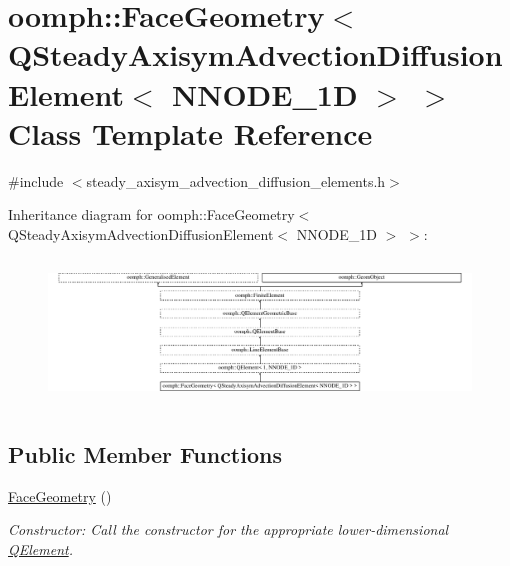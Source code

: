 \hypertarget{classoomph_1_1FaceGeometry_3_01QSteadyAxisymAdvectionDiffusionElement_3_01NNODE__1D_01_4_01_4}{}\section{oomph\+:\+:Face\+Geometry$<$ Q\+Steady\+Axisym\+Advection\+Diffusion\+Element$<$ N\+N\+O\+D\+E\+\_\+1D $>$ $>$ Class Template Reference}
\label{classoomph_1_1FaceGeometry_3_01QSteadyAxisymAdvectionDiffusionElement_3_01NNODE__1D_01_4_01_4}


{\ttfamily \#include $<$steady\+\_\+axisym\+\_\+advection\+\_\+diffusion\+\_\+elements.\+h$>$}

Inheritance diagram for oomph\+:\+:Face\+Geometry$<$ Q\+Steady\+Axisym\+Advection\+Diffusion\+Element$<$ N\+N\+O\+D\+E\+\_\+1D $>$ $>$\+:\begin{figure}[H]
\begin{center}
\leavevmode
\includegraphics[height=3.904383cm]{classoomph_1_1FaceGeometry_3_01QSteadyAxisymAdvectionDiffusionElement_3_01NNODE__1D_01_4_01_4}
\end{center}
\end{figure}
\subsection*{Public Member Functions}
\begin{DoxyCompactItemize}
\item 
\hyperlink{classoomph_1_1FaceGeometry_3_01QSteadyAxisymAdvectionDiffusionElement_3_01NNODE__1D_01_4_01_4_af895538fa66dc68cbbc725c3d5278df3}{Face\+Geometry} ()
\begin{DoxyCompactList}\small\item\em Constructor\+: Call the constructor for the appropriate lower-\/dimensional \hyperlink{classoomph_1_1QElement}{Q\+Element}. \end{DoxyCompactList}\end{DoxyCompactItemize}
